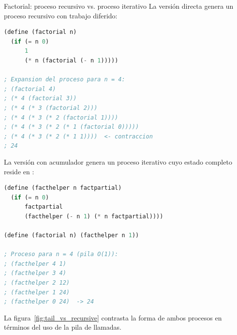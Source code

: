 \begin{ejemplo}{Factorial: proceso recursivo vs. proceso iterativo}
La versión directa genera un proceso recursivo con trabajo diferido:
\begin{lstlisting}[language=Lisp, caption={Factorial: proceso recursivo (expansión y contracción)}]
(define (factorial n)
  (if (= n 0)
      1
      (* n (factorial (- n 1)))))

; Expansion del proceso para n = 4:
; (factorial 4)
; (* 4 (factorial 3))
; (* 4 (* 3 (factorial 2)))
; (* 4 (* 3 (* 2 (factorial 1))))
; (* 4 (* 3 (* 2 (* 1 (factorial 0)))))
; (* 4 (* 3 (* 2 (* 1 1))))  <- contraccion
; 24
\end{lstlisting}

La versión con acumulador genera un proceso iterativo cuyo estado completo reside en :
\begin{lstlisting}[language=Lisp, caption={Factorial: proceso iterativo (tail-recursive)}]
(define (facthelper n factpartial)
  (if (= n 0)
      factpartial
      (facthelper (- n 1) (* n factpartial))))

(define (factorial n) (facthelper n 1))

; Proceso para n = 4 (pila O(1)):
; (facthelper 4 1)
; (facthelper 3 4)
; (facthelper 2 12)
; (facthelper 1 24)
; (facthelper 0 24)  -> 24
\end{lstlisting}
\end{ejemplo}

La figura~\ref{fig:tail_vs_recursive} contrasta la forma de ambos procesos en términos del uso de la pila de llamadas.

